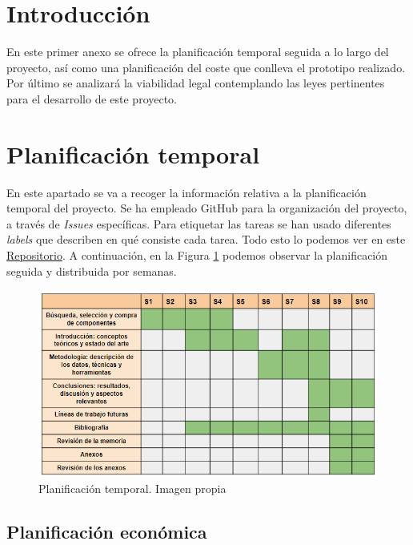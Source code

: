 
\section{Introducción}
En este primer anexo se ofrece la planificación temporal seguida a lo largo del proyecto, así como una planificación del coste que conlleva el prototipo realizado. Por último se analizará la viabilidad legal contemplando las leyes pertinentes para el desarrollo de este proyecto.


\section{Planificación temporal}

En este apartado se va a recoger la información relativa a la planificación temporal del proyecto. Se ha empleado GitHub para la organización del proyecto, a través de \textit{Issues} específicas. Para etiquetar las tareas se han usado diferentes \textit{labels} que describen en qué consiste cada tarea. Todo esto lo podemos ver en este \href{https://github.com/CeliaValladolid/TFG_Valvula_Derivacion_VentriculoPeritoneal}{Repositorio}.
A continuación, en la Figura \ref{fig:planificación} podemos observar la planificación seguida y distribuida por semanas.
\begin{figure}[h]
    \centering
    \includegraphics[width=1.1\textwidth]{img/planificacion.PNG}
    \caption{Planificación temporal. Imagen propia}
    \label{fig:planificación}
\end{figure}

\subsection{Planificación económica}

